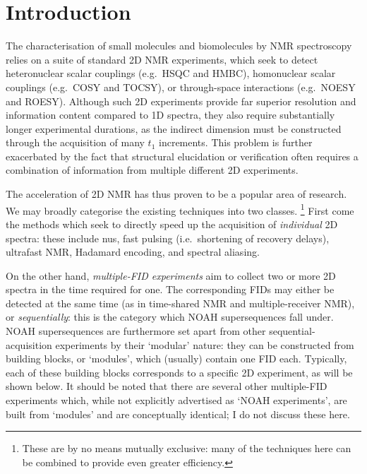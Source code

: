 \section{Introduction}
\label{sec:noah__introduction}

The characterisation of small molecules and biomolecules by NMR spectroscopy relies on a suite of standard 2D NMR experiments, which seek to detect heteronuclear scalar couplings (e.g.\ HSQC and HMBC), homonuclear scalar couplings (e.g.\ COSY and TOCSY), or through-space interactions (e.g.\ NOESY and ROESY).
Although such 2D experiments provide far superior resolution and information content compared to 1D spectra, they also require substantially longer experimental durations, as the indirect dimension must be constructed through the acquisition of many $t_1$ increments.
This problem is further exacerbated by the fact that structural elucidation or verification often requires a combination of information from multiple different 2D experiments.

The acceleration of 2D NMR has thus proven to be a popular area of research.
We may broadly categorise the existing techniques into two classes.%
\footnote{These are by no means mutually exclusive: many of the techniques here can be combined to provide even greater efficiency.}
First come the methods which seek to directly speed up the acquisition of \textit{individual} 2D spectra: these include
\acf{nus}\autocite{Barna1987JMR,Kazimierczuk2010PNMRS,Mobli2014PNMRS,Kazimierczuk2015MRC},
fast pulsing (i.e.\ shortening of recovery delays)\autocite{SchulzeSunninghausen2014JACS,Schanda2006JACS,Kupce2007MRC,Schanda2009PNMRS},
ultrafast NMR\autocite{Frydman2002PNASUSA,Pelupessy2003JACS,Frydman2003JACS,Tal2010PNMRS,Gouilleux2018ARNMRS,Kupce2021NRMP},
Hadamard encoding\autocite{Kupce2003JMR,Kupce2003PNMRS},
and spectral aliasing\autocite{Jeannerat2000MRC,Bermel2009JACS,Njock2010C,Jeannerat2011eMR}.

On the other hand, \textit{multiple-FID experiments} aim to collect two or more 2D spectra in the time required for one.
The corresponding FIDs may either be detected at the same time (as in
time-shared NMR\autocite{Nolis2007ACIE,Parella2010CMR,Nolis2019JMR_psHSQC} and
multiple-receiver NMR\autocite{Kupce2006JACS,Kupce2008JACS,Kovacs2016MRC}),
or \textit{sequentially}: this is the category which NOAH supersequences\autocite{Kupce2017ACIE,Kupce2021PNMRS,Kupce2021NRMP} fall under.
NOAH supersequences are furthermore set apart from other sequential-acquisition experiments\autocite{Haasnoot1984JMR,Gurevich1984JMR,MotiramCorral2018CC,Nolis2019MRC,Nolis2019CPC,Nolis2019JMR} by their `modular' nature: they can be constructed from building blocks, or `modules', which (usually) contain one FID each.
Typically, each of these building blocks corresponds to a specific 2D experiment, as will be shown below.
It should be noted that there are several other multiple-FID experiments which, while not explicitly advertised as `NOAH experiments', are built from `modules' and are conceptually identical\autocite{Nagy2019CC,Nagy2020JMR,Nagy2021ACIE,Timari2022CC}; I do not discuss these here.

